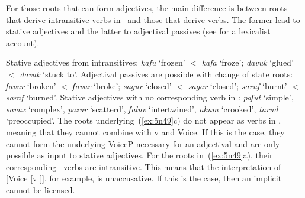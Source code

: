 \begin{exe}
\begin{xlist}
\begin{exe}
\begin{xlist}
\begin{exe}
\begin{exe}
\begin{xlist}
\begin{exe}
\begin{exe}
\begin{xlist}
\begin{exe}
\begin{xlist}
\begin{exe}
\begin{xlist}
\begin{exe}
\begin{xlist}
\begin{exe}
\begin{xlist}
\begin{xlist}
\begin{exe}
\begin{xlist}
\begin{exe}
\begin{xlist}
\begin{exe}
\begin{exe}
\begin{exe}
\begin{xlist}
\begin{exe}
\begin{exe}
\begin{xlist}
\begin{exe}
\begin{xlist}
\begin{exe}
\begin{xlist}
\begin{exe}
\begin{xlist}
\begin{xlist}
\begin{exe}
\begin{xlist}
\begin{exe}
\begin{xlist}
\begin{exe}
\begin{xlist}
\begin{exe}
\begin{xlist}
\begin{exe}
\begin{exe}
\begin{exe}
\begin{exe}
\begin{exe}
\begin{xlist}
\begin{xlist}
\begin{exe}
\begin{xlist}
\begin{exe}
\begin{xlist}
\begin{exe}
\begin{exe}
 \z 

For those roots that can form adjectives, the main difference is between roots that derive intransitive verbs in \tkal~and those that derive  verbs. The former lead to stative adjectives and the latter to adjectival passives (see \citealt{meltzerasscher11} for a lexicalist account).
 \begin{exe}
 \ex   \label{ex:5n49}
 \begin{xlist} 
   \ex  Stative adjectives from intransitives: \emph{kafu} `frozen' $<$ \emph{kafa} `froze'; \emph{davuk} `glued' $<$ \emph{davak} `stuck to'.  
   \ex  Adjectival passives are possible with change of state roots: \emph{ʃavur} `broken' $<$ \emph{ʃavar} `broke'; \emph{sagur} `closed' $<$ \emph{sagar} `closed'; \emph{saruf} `burnt' $<$ \emph{saraf} `burned'.  
   \ex  Stative adjectives with no corresponding verb in \tkal: \emph{paʃut} `simple', \emph{savux} `complex', \emph{pazur} `scatterd', \emph{ʃaluv} `intertwined', \emph{akum} `crooked', \emph{tarud} `preoccupied'. 
   \z
\z 
The roots underlying~(\ref{ex:5n49}c) do not appear as verbs in \tkal, meaning that they cannot combine with v and Voice. If this is the case, they cannot form the underlying VoiceP necessary for an adjectival  and are only possible as input to stative adjectives. For the roots in~(\ref{ex:5n49}a), their corresponding \tkal~verbs are intransitive. This means that the interpretation of [Voice [v ]], for example, is unaccusative. If this is the case, then an implicit  cannot be licensed.




\end{xlist}
\end{exe}
\end{exe}
\end{exe}
\end{xlist}
\end{exe}
\end{xlist}
\end{exe}
\end{xlist}
\end{xlist}
\end{exe}
\end{exe}
\end{exe}
\end{exe}
\end{exe}
\end{xlist}
\end{exe}
\end{xlist}
\end{exe}
\end{xlist}
\end{exe}
\end{xlist}
\end{exe}
\end{xlist}
\end{xlist}
\end{exe}
\end{xlist}
\end{exe}
\end{xlist}
\end{exe}
\end{xlist}
\end{exe}
\end{exe}
\end{xlist}
\end{exe}
\end{exe}
\end{exe}
\end{xlist}
\end{exe}
\end{xlist}
\end{exe}
\end{xlist}
\end{xlist}
\end{exe}
\end{xlist}
\end{exe}
\end{xlist}
\end{exe}
\end{xlist}
\end{exe}
\end{xlist}
\end{exe}
\end{exe}
\end{xlist}
\end{exe}
\end{exe}
\end{xlist}
\end{exe}
\end{xlist}
\end{exe}
